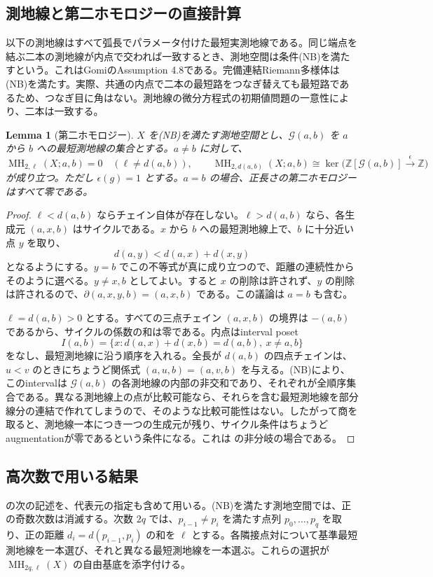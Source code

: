 \documentclass[12pt]{amsart}
\newtheorem{lem}[thm]{Lemma}
\theoremstyle{definition}
\theoremstyle{remark}
\numberwithin{equation}{section}
\newcommand{\Z}{\mathbb{Z}}
\DeclareMathOperator{\MH}{MH}
\begin{document}
\subsection{測地線と第二ホモロジーの直接計算}
以下の測地線はすべて弧長でパラメータ付けた最短実測地線である。同じ端点を結ぶ二本の測地線が内点で交われば一致するとき、測地空間は条件(NB)を満たすという。これはGomiのAssumption 4.8である。完備連結Riemann多様体は(NB)を満たす。実際、共通の内点で二本の最短路をつなぎ替えても最短路であるため、つなぎ目に角はない。測地線の微分方程式の初期値問題の一意性により、二本は一致する。

\begin{lem}[第二ホモロジー]\label{lem:degree-two}
$X$ を(NB)を満たす測地空間とし、$\mathcal G(a,b)$ を $a$ から $b$ への最短測地線の集合とする。$a\ne b$ に対して、
\[
 \MH_{2,\ell}(X;a,b)=0\quad(\ell\ne d(a,b)),\qquad
 \MH_{2,d(a,b)}(X;a,b)\cong\ker\bigl(\Z[\mathcal G(a,b)]\xrightarrow{\epsilon}\Z\bigr)
\]
が成り立つ。ただし $\epsilon(g)=1$ とする。$a=b$ の場合、正長さの第二ホモロジーはすべて零である。
\end{lem}
\begin{proof}
$\ell<d(a,b)$ ならチェイン自体が存在しない。$\ell>d(a,b)$ なら、各生成元 $(a,x,b)$ はサイクルである。$x$ から $b$ への最短測地線上で、$b$ に十分近い点 $y$ を取り、
\[
 d(a,y)<d(a,x)+d(x,y)
\]
となるようにする。$y=b$ でこの不等式が真に成り立つので、距離の連続性からそのように選べる。$y\ne x,b$ としてよい。すると $x$ の削除は許されず、$y$ の削除は許されるので、$\partial(a,x,y,b)=(a,x,b)$ である。この議論は $a=b$ も含む。

$\ell=d(a,b)>0$ とする。すべての三点チェイン $(a,x,b)$ の境界は $-(a,b)$ であるから、サイクルの係数の和は零である。内点はinterval poset
\[
 I(a,b)=\{x:d(a,x)+d(x,b)=d(a,b),\ x\ne a,b\}
\]
をなし、最短測地線に沿う順序を入れる。全長が $d(a,b)$ の四点チェインは、$u<v$ のときにちょうど関係式 $(a,u,b)=(a,v,b)$ を与える。(NB)により、このintervalは $\mathcal G(a,b)$ の各測地線の内部の非交和であり、それぞれが全順序集合である。異なる測地線上の点が比較可能なら、それらを含む最短測地線を部分線分の連結で作れてしまうので、そのような比較可能性はない。したがって商を取ると、測地線一本につき一つの生成元が残り、サイクル条件はちょうどaugmentationが零であるという条件になる。これは \cite[Corollary 3.15]{Gomi} の非分岐の場合である。
\end{proof}

\subsection{高次数で用いる結果}
\cite[Definition 5.11, Proposition 5.15, Theorem 5.22]{Gomi} の次の記述を、代表元の指定も含めて用いる。(NB)を満たす測地空間では、正の奇数次数は消滅する。次数 $2q$ では、$p_{i-1}\ne p_i$ を満たす点列 $p_0,\ldots,p_q$ を取り、正の距離 $d_i=d(p_{i-1},p_i)$ の和を $\ell$ とする。各隣接点対について基準最短測地線を一本選び、それと異なる最短測地線を一本選ぶ。これらの選択が $\MH_{2q,\ell}(X)$ の自由基底を添字付ける。
\end{document}

